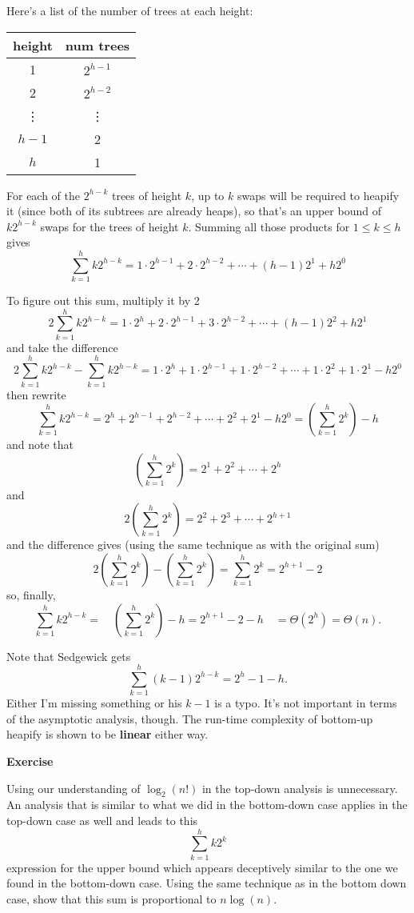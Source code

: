 \documentclass{article}
\begin{document}
\vspace{1pc}
Here's a list of the number of trees at each height:
\begin{center}
\begin{tabular}{c|c}
height  & num trees \\
\hline
 1      & $2^{h-1}$ \\
 2      & $2^{h-2}$ \\
 \vdots & \vdots    \\
 $h-1$  & 2         \\
 $h$    & 1         \\
\end{tabular}
\end{center}

For each of the $2^{h-k}$ trees of height $k$, up to $k$ swaps will be required
to heapify it (since both of its subtrees are already heaps), so that's an
upper bound of $k2^{h-k}$ swaps for the trees of height $k$. Summing all those
products for
$1\le k\le h$ gives
\[
  \sum_{k=1}^{h} k2^{h-k}
=
  1\cdot2^{h-1} + 2\cdot2^{h-2} + \cdots + (h-1)2^1 + h2^0
\]

To figure out this sum, multiply it by 2
\[
  2\sum_{k=1}^{h} k2^{h-k}
=
  1\cdot2^{h} + 2\cdot2^{h-1} + 3\cdot2^{h-2} + \cdots + (h-1)2^2 + h2^1
\]
and take the difference
\[
  2\sum_{k=1}^{h} k2^{h-k}
-
  \sum_{k=1}^{h} k2^{h-k}
=
  1\cdot2^{h} + 1\cdot2^{h-1} + 1\cdot2^{h-2} + \cdots + 1\cdot2^2 + 1\cdot2^1 - h2^0
\]
then rewrite
\[
  \sum_{k=1}^{h} k2^{h-k}
=
  2^{h} + 2^{h-1} + 2^{h-2} + \cdots + 2^2 + 2^1 - h2^0
=
  \left(\sum_{k=1}^{h} 2^{k}\right) - h
\]
and note that
\[
  \left(\sum_{k=1}^{h} 2^{k}\right)
= 
  2^1 + 2^2 + \cdots + 2^h
\]
and
\[
  2\left(\sum_{k=1}^{h} 2^{k}\right)
= 
  2^2 + 2^3 + \cdots + 2^{h+1}
\]
and the difference gives (using the same technique as with the original sum)
\[
  2\left(\sum_{k=1}^{h} 2^{k}\right)
  -\left(\sum_{k=1}^{h} 2^{k}\right)
=
  \sum_{k=1}^{h} 2^{k}
=
  2^{h+1} - 2
\]
so, finally,
\[
  \sum_{k=1}^{h} k2^{h-k}
=
\quad
  \left(\sum_{k=1}^{h} 2^{k}\right) - h
=
  2^{h+1} - 2 - h
\quad
=
  \Theta(2^h)
=
  \Theta(n).
\]

Note that Sedgewick gets
\[
  \sum_{k=1}^{h} (k-1)2^{h-k}
=
  2^{h} - 1 - h.
\]
Either I'm missing something or his $k-1$ is a typo.
It's not important in terms of the asymptotic analysis, though.
The run-time complexity of bottom-up heapify is shown to be \textbf{linear}
either way.

\vspace{1pc}
{\large\bf Exercise}

Using our understanding of $\log_2(n!)$ in the top-down analysis is
unnecessary.
An analysis that is similar to what we did in the bottom-down case applies in
the top-down case as well and leads to
this
\[
  \sum_{k=1}^{h} k2^k
\]
expression for the upper bound which appears deceptively similar to the one we
found in the bottom-down case. Using the same technique as in the bottom down
case, show that this sum is proportional to $n\log(n)$.
\end{document}
